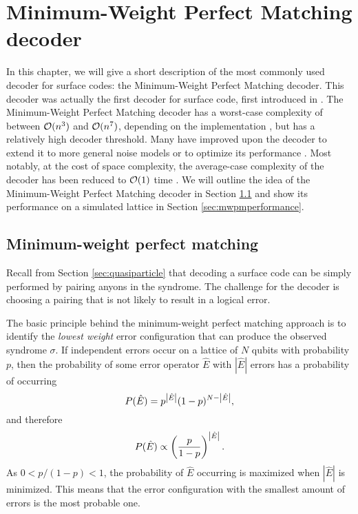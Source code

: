 
\chapter{Minimum-Weight Perfect Matching decoder}\label{ch:mwpm}

In this chapter, we will give a short description of the most commonly used decoder for surface codes: the Minimum-Weight Perfect Matching decoder. This decoder was actually the first decoder for surface code, first introduced in \cite{dennis2002topological}. The Minimum-Weight Perfect Matching decoder has a worst-case complexity of between $\mathcal{O}(n^3)$ and $\mathcal{O}(n^7)$, depending on the implementation \cite{edmonds1965paths, kolmogorov2009blossom}, but has a relatively high decoder threshold. Many have improved upon the decoder to extend it to more general noise models or to optimize its performance \cite{fowler2012towards, fowler2012surface, fowler2013optimal, stace2009thresholds, stace2010error}. Most notably, at the cost of space complexity, the average-case complexity of the decoder has been reduced to $\mathcal{O}(1)$ time \cite{fowler2013minimum}. We will outline the idea of the Minimum-Weight Perfect Matching decoder in Section \ref{sec:mwpm} and show its performance on a simulated lattice in Section \ref{sec:mwpmperformance}.

\section{Minimum-weight perfect matching}\label{sec:mwpm}

Recall from Section \ref{sec:quasiparticle} that decoding a surface code can be simply performed by pairing anyons in the syndrome. The challenge for the decoder is choosing a pairing that is not likely to result in a logical error. 

The basic principle behind the minimum-weight perfect matching approach is to identify the \emph{lowest weight} error configuration that can produce the observed syndrome $\sigma$. If independent errors occur on a lattice of $N$ qubits with probability $p$, then the probability of some error operator $\hat{E}$ with $|\hat{E}|$ errors has a probability of occurring
\begin{equation}
  P(\hat{E}) = p^{\abs{\hat{E}}}(1-p)^{N-\abs{\hat{E}}},
\end{equation}
and therefore
\begin{equation}
  P(\hat{E})\propto \left(\frac{p}{1-p}\right)^\abs{\hat{E}}.
\end{equation}
As $0<p/(1-p)<1$, the probability of $\hat{E}$ occurring is maximized when $|\hat{E}|$ is minimized. This means that the error configuration with the smallest amount of errors is the most probable one. 

